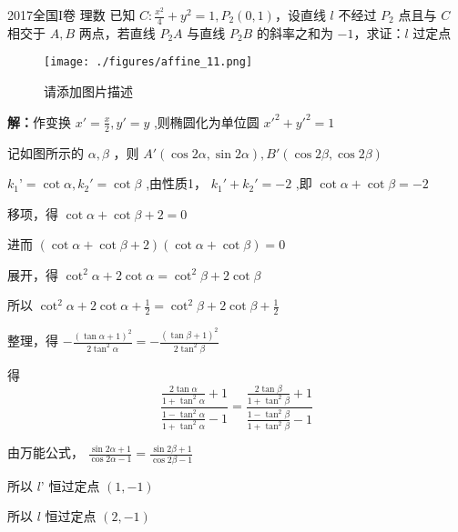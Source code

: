 \begin{example}{2017全国I卷 理数}
已知 \(C:\frac{x^2}4+y^2=1,P_2(0,1)\)，设直线 \(l\) 不经过 \(P_2\) 点且与 \(C\) 相交于 \(A,B\) 两点，若直线 \(P_2A\) 与直线 \(P_2B\) 的斜率之和为 \(-1\)，求证：\(l\) 过定点
\begin{figure}[ht]
\centering
\texttt{[image: ./figures/affine\_11.png]}
\caption{请添加图片描述} \label{affine_fig11}
\end{figure}
\textbf{解：}作变换 \(x'=\frac{x}{2},y'=y\) ,则椭圆化为单位圆 \(x'^2+y'^2=1\)

记如图所示的 \(\alpha,\beta\) ，则 \(A'(\cos2\alpha,\sin2\alpha),B'(\cos2\beta,\cos2\beta)\)

\(k_1’=\cot{\alpha},k_2'=\cot{\beta}\) ,由性质1， \(k_1'+k_2'=-2\) ,即 \(\cot{\alpha}+\cot{\beta}=-2\)

移项，得 \(\cot\alpha+\cot \beta+2=0\)

进而 \((\cot\alpha+\cot \beta+2)(\cot \alpha+\cot\beta)=0\)

展开，得 \(\cot^2\alpha+2\cot\alpha=\cot^2\beta+2\cot\beta\)

所以 \(\cot^2\alpha+2\cot\alpha+\frac{1}{2}=\cot^2\beta+2\cot\beta+\frac{1}{2}\)

整理，得 \(-\frac{(\tan\alpha+1)^2}{2\tan^2\alpha}=-\frac{(\tan\beta+1)^2}{2\tan^2\beta}\)

得 
$$\frac{\frac{2\tan\alpha}{1+\tan^2\alpha}+1}{\frac{1-\tan^2\alpha}{1+\tan^2\alpha}-1}=\frac{\frac{2\tan\beta}{1+\tan^2\beta}+1}{\frac{1-\tan^2\beta}{1+\tan^2\beta}-1}$$

由万能公式， \(\frac{\sin2\alpha+1}{\cos2\alpha-1}=\frac{\sin2\beta+1}{\cos2\beta-1}\)

所以 \(l’\) 恒过定点 \((1,-1)\)

所以 \(l\) 恒过定点 \((2,-1)\) 
\end{example}
